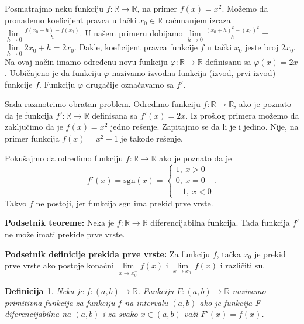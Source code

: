 \documentclass{article}
\newtheorem{definicija}{Definicija}[section]
\begin{document}
Posmatrajmo neku funkciju $f: \mathbb{R} \longrightarrow \mathbb{R}$, na primer
$f\left(x\right) = x^2$. Možemo da pronađemo koeficijent pravca u tački
$x_0 \in \mathbb{R}$ računanjem izraza $\lim\limits_{h \to 0} \frac{f\left(x_0+h\right) - f\left(x_0\right)}{h}$.
U našem primeru dobijamo
$\lim\limits_{h \to 0} \frac{\left(x_0+h\right)^2 - \left(x_0\right)^2}{h} = $
$\lim\limits_{h \to 0} 2 x_0 + h = 2 x_0$.
Dakle, koeficijent pravca funkcije $f$ u tački $x_0$ jeste broj $2 x_0$.
Na ovaj način imamo određenu novu funkciju
$\varphi : \mathbb{R} \longrightarrow \mathbb{R}$ definisanu
sa $\varphi\left(x\right) = 2 x$. Uobičajeno je da funkciju $\varphi$ nazivamo
izvodna funkcija (izvod, prvi izvod) funkcije $f$.
Funkciju $\varphi$ drugačije označavamo sa $f'$.\par
Sada razmotrimo obratan problem. Odredimo funkciju $f: \mathbb{R} \longrightarrow \mathbb{R}$,
ako je poznato da je funkcija
$f': \mathbb{R} \longrightarrow \mathbb{R}$ definisana sa
$f'\left(x\right) = 2 x$. Iz prošlog primera možemo da zaključimo da je $f\left(x\right) = x^2$ jedno rešenje. Zapitajmo
se da li je i jedino. Nije, na primer funkcija $f\left(x\right) = x^2 + 1$
je takođe rešenje.\par
Pokušajmo da odredimo funkciju $f: \mathbb{R} \longrightarrow \mathbb{R}$ ako je
poznato da je
$$
    f'\left(x\right) = \text{sgn}\left(x\right)=
    \begin{cases}
        1,\ x > 0 \\
        0,\ x = 0 \\
        -1,\ x < 0
    \end{cases}.
$$
Takvo $f$ ne postoji, jer funkcija $\text{sgn}$ ima prekid prve vrste.

\begin{teoremabox}
    \label{podsetnik_teoreme_1}
    \textbf{Podsetnik teoreme:} Neka je $f: \mathbb{R}\longrightarrow\mathbb{R}$ diferencijabilna funkcija.
    Tada funkcija $f'$ ne može imati prekide prve vrste.
\end{teoremabox}

\begin{defbox}
    \label{podsetnik_definicije_1}
    \textbf{Podsetnik definicije prekida prve vrste:} Za funkciju $f$,
    tačka $x_0$ je prekid prve vrste ako postoje konačni $\lim\limits_{x\rightarrow x_0^+}f\left(x\right)$
    i $\lim\limits_{x\rightarrow x_0^-}f\left(x\right)$ i različiti su.
\end{defbox}

\begin{defbox}
    \label{definicija_1.1}
    \begin{definicija}
        Neka je $f:\left(a, b\right) \longrightarrow \mathbb{R}$.
        Funkciju $F:\left(a, b\right) \longrightarrow \mathbb{R}$ nazivamo primitivna
        funkcija za funkciju $f$ na intervalu $\left(a, b\right)$ ako je funkcija F
        diferencijabilna na $\left(a, b\right)$ i za svako $x \in \left(a,b\right)$ važi
        $F'\left(x\right) = f\left(x\right)$.
    \end{definicija}
\end{defbox}
\end{document}
